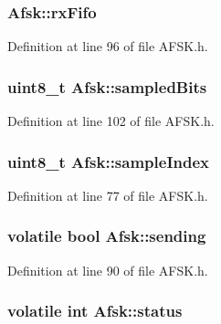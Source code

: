 \subsubsection[{\texorpdfstring{rx\+Fifo}{rxFifo}}]{ Afsk\+::rx\+Fifo}\hypertarget{struct_afsk_ac37f5dab53ed2219bbfc0d4c3f2f25b8}{}\label{struct_afsk_ac37f5dab53ed2219bbfc0d4c3f2f25b8}


Definition at line 96 of file A\+F\+S\+K.\+h.

\subsubsection[{\texorpdfstring{sampled\+Bits}{sampledBits}}]{\setlength{\rightskip}{0pt plus 5cm}uint8\+\_\+t Afsk\+::sampled\+Bits}\hypertarget{struct_afsk_af07324b473ed86d0f79b539d0e76ed8c}{}\label{struct_afsk_af07324b473ed86d0f79b539d0e76ed8c}


Definition at line 102 of file A\+F\+S\+K.\+h.

\subsubsection[{\texorpdfstring{sample\+Index}{sampleIndex}}]{\setlength{\rightskip}{0pt plus 5cm}uint8\+\_\+t Afsk\+::sample\+Index}\hypertarget{struct_afsk_a6a63466f08a5391a6515479363283fdf}{}\label{struct_afsk_a6a63466f08a5391a6515479363283fdf}


Definition at line 77 of file A\+F\+S\+K.\+h.

\subsubsection[{\texorpdfstring{sending}{sending}}]{\setlength{\rightskip}{0pt plus 5cm}volatile bool Afsk\+::sending}\hypertarget{struct_afsk_aea4204b922aaf2c78708bacec08d7888}{}\label{struct_afsk_aea4204b922aaf2c78708bacec08d7888}


Definition at line 90 of file A\+F\+S\+K.\+h.

\subsubsection[{\texorpdfstring{status}{status}}]{\setlength{\rightskip}{0pt plus 5cm}volatile int Afsk\+::status}\hypertarget{struct_afsk_a4b90678865e08c02384199c6b10aa5b5}{}\label{struct_afsk_a4b90678865e08c02384199c6b10aa5b5}


